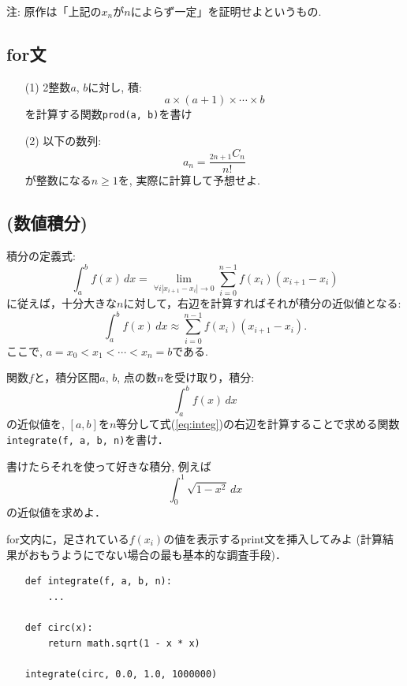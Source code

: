 \documentclass[10pt,dvipdfmx]{article}
\begin{document}
注: 原作は「上記の$x_n$が$n$によらず一定」を証明せよというもの.
\fi

\subsection{{\scriptsize for文}}
\begin{itemize}
\item [(1)] 2整数$a$, $b$に対し, 積:
  \[ a \times (a + 1) \times \cdots \times b \]
  を計算する関数{\tt prod(a, b)}を書け
\item [(2)] 以下の数列:
  \[ a_n = \frac{{}_{2n+1}C_{n}}{n!} \]
  が整数になる$n \geq 1$を, 実際に計算して予想せよ.
\end{itemize}

\subsection{{\scriptsize (数値積分)}} 
\label{subsec:integrate}
積分の定義式:
\begin{equation}
\int_a^b f(x)\,dx = \lim_{\forall i|x_{i+1}-x_i| \rightarrow 0} \sum_{i=0}^{n-1} f(x_i) (x_{i+1} - x_i)
\end{equation}
に従えば，十分大きな$n$に対して，右辺を計算すればそれが積分の近似値となる:
\begin{equation}
\int_a^b f(x)\,dx \approx \sum_{i=0}^{n-1} f(x_i) (x_{i+1} - x_i).
\label{eq:integ}
\end{equation}
ここで, $a = x_0 < x_1 < \cdots < x_n = b$である.

関数$f$と，積分区間$a$, $b$, 点の数$n$を受け取り，積分:
\[ \int_a^b f(x)\,dx \]
の近似値を, $[a, b]$を$n$等分して式(\ref{eq:integ})の右辺を計算することで求める関数
{\tt integrate(f, a, b, n)}を書け．

書けたらそれを使って好きな積分, 例えば
\[ \int_0^1 \sqrt{1 - x^2}\, dx \]
の近似値を求めよ．

for文内に，足されている$f(x_i)$の値を表示するprint文を挿入してみよ
(計算結果がおもうようにでない場合の最も基本的な調査手段)．

\begin{itemize}
\item []
\begin{lstlisting}
def integrate(f, a, b, n):
    ...

def circ(x):
    return math.sqrt(1 - x * x)

integrate(circ, 0.0, 1.0, 1000000)
\end{lstlisting}
\end{itemize}
\end{document}
